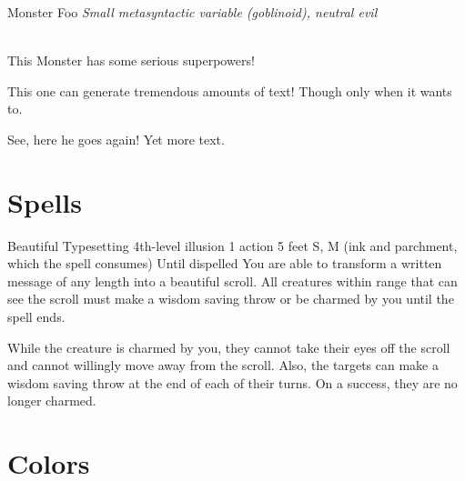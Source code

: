 \documentclass[10pt,twoside,twocolumn,openany]{book}
\begin{document}
\newpage %

\begin{monsterbox}{Monster Foo}
	\textit{Small metasyntactic variable (goblinoid), neutral evil}\\
	\hline
	\basics[%
	armorclass = 12,
	hitpoints  = \dice{3d8 + 3},
	speed      = 50 ft
	]
	\hline
	\stats[
    STR = \stat{12}, %
    DEX = \stat{7}
	]
	\hline
	\details[%
	languages = {Common Lisp, Erlang},
	]
	\hline \\[1mm]
	\begin{monsteraction}
		This Monster has some serious superpowers!
	\end{monsteraction}
	\begin{monsteraction}
		This one can generate tremendous amounts of text! Though only when it wants to.
	\end{monsteraction}

	\begin{monsteraction}
    See, here he goes again! Yet more text.
	\end{monsteraction}
\end{monsterbox}

\section{Spells}

\begin{spell}
	{Beautiful Typesetting}
	{4th-level illusion}
	{1 action}
	{5 feet}
	{S, M (ink and parchment, which the spell consumes)}
	{Until dispelled}
	You are able to transform a written message of any length into a beautiful scroll. All creatures within range that can see the scroll must make a wisdom saving throw or be charmed by you until the spell ends.

	While the creature is charmed by you, they cannot take their eyes off the scroll and cannot willingly move away from the scroll. Also, the targets can make a wisdom saving throw at the end of each of their turns. On a success, they are no longer charmed.
\end{spell}

\section{Colors}
\end{document}
